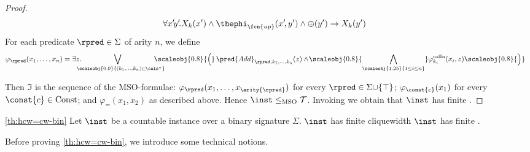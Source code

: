 \begin{proof}
\begin{align*}
    		\forall x'\!y'\!. X_k(x') \wedge \thephi_\fcn{up}(x'\!,y') \wedge \oplus(y') & \to X_{k}(y')
    	\end{align*}
    	For each predicate $\rpred\in \Sigma$ of arity $n$, we define
    	\begin{align*}
    		\varphi_{\rpred}(x_1,\ldots,x_n) & = 
    		\exists z.\hspace{-4ex}
    		\bigvee_{\hspace{2ex}
    			\scaleobj{0.9}{(k_1,\ldots,k_n) \in \cols^n}
    		}\hspace{-4ex} 
    		\scaleobj{0.8}{\Big(}
    		\,\pred{Add}_{\rpred,k_1,\ldots,k_n}(z) \wedge\! \scaleobj{0.8}{\bigwedge_{\scaleobj{1.25}{1 \leq i \leq n}}} \varphi^\mathrm{colIn}_{k_i}(x_i,z) 
    		\scaleobj{0.8}{\Big)}
    	\end{align*}
    	
    	Then $\mathfrak{I}$ is the sequence of the MSO-formulae: $\varphi_{\rpred}(x_1, \ldots, x_{\arity{\rpred}})$ for every $\rpred\in\Sigma{\cup}\{ \top \}$; $\varphi_{\const{c}}(x_1)$ for every $\const{c}\in\mathrm{Const}$; and $\varphi_{=}(x_1, x_2)$ as described above.
    	Hence $\inst \leq_{\text{MSO}} \mathcal{T}$. Invoking  we obtain that $\inst$ has finite \partitionwidth{}.
\end{proof}


\begin{customprop}{\ref{th:hcw=cw-bin}}
	Let $\inst$ be a countable instance over a binary signature $\Sigma$.
	$\inst$ has finite cliquewidth \iffi $\inst$ has finite \ercwidth{}.
\end{customprop}


Before proving \cref{th:hcw=cw-bin}, we introduce some technical notions.


